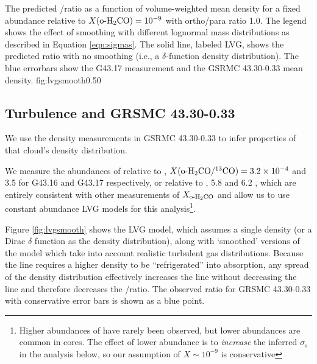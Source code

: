 {The predicted \formaldehyde \oneone/\twotwo ratio as a function of volume-weighted mean
density for a fixed abundance relative to \hh $X(\textrm{o-H}_2\textrm{CO}) = 10^{-9}$  with \hh
ortho/para ratio 1.0.  The legend shows the effect of smoothing with different
lognormal mass distributions as described in Equation \ref{eqn:sigmas}.  %
The solid line, labeled LVG, shows the predicted ratio
with no smoothing (i.e., a $\delta$-function density distribution).
The blue errorbars show the G43.17 \formaldehyde measurement and the GSRMC
43.30-0.33 mean density.
}
{fig:lvgsmooth}{0.5}{0}

\subsection{Turbulence and GRSMC 43.30-0.33}
We use the density measurements in GSRMC 43.30-0.33 to infer properties of that
cloud's density distribution.

We measure the abundances of \ortho relative to \thirteenco,
$X(\textrm{o-H}_2\textrm{CO}/^{13}\textrm{CO}) = 3.2\times10^{-4}$ and 3.5 for G43.16 and G43.17
respectively, or relative to \hh, 5.8 and 6.2 , which are
entirely consistent with other measurements of $X_{\textrm{o-H}_2\textrm{CO}}$
\citep{Johnstone2003a} and allow us to use constant abundance LVG models for this
analysis\footnote{Higher abundances of \formaldehyde have rarely been observed,
but lower abundances are common in cores.  The effect of lower abundance is to
\emph{increase} the inferred $\sigma_s$ in the analysis below, so our
assumption of $X\sim10^{-9}$ is conservative}.  

Figure \ref{fig:lvgsmooth} shows the LVG model, which assumes a single density
(or a Dirac $\delta$ function as the density distribution), along with
`smoothed' versions of the model which take into account realistic turbulent
gas distributions.  Because the \formaldehyde \twotwo line requires a higher
density to be ``refrigerated'' into absorption, any spread of the density
distribution effectively increases the \twotwo line without decreasing the
\oneone line and therefore decreases the \oneone/\twotwo ratio.  The observed
ratio for GRSMC 43.30-0.33 with conservative error bars is shown as a blue
point.  

